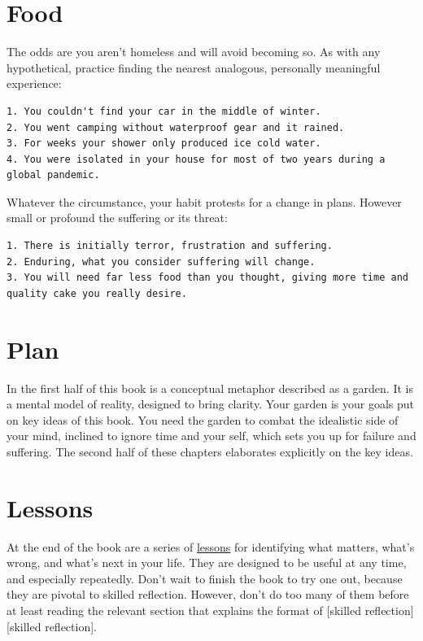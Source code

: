 \documentclass[
]{book}
\begin{document}
\hypertarget{food}{%
\section{Food}\label{food}}

The odds are you aren't homeless and will avoid becoming so.
As with any hypothetical, practice finding the nearest analogous, personally meaningful experience:

\begin{verbatim}
1. You couldn't find your car in the middle of winter.
2. You went camping without waterproof gear and it rained.
3. For weeks your shower only produced ice cold water.
4. You were isolated in your house for most of two years during a global pandemic.  
\end{verbatim}

Whatever the circumstance, your habit protests for a change in plans.
However small or profound the suffering or its threat:

\begin{verbatim}
1. There is initially terror, frustration and suffering.
2. Enduring, what you consider suffering will change.
3. You will need far less food than you thought, giving more time and quality cake you really desire.   
\end{verbatim}

\hypertarget{intro-plan}{%
\section{Plan}\label{intro-plan}}

In the first half of this book is a conceptual metaphor described as a garden.
It is a mental model of reality, designed to bring clarity.
Your garden is your goals put on key ideas of this book.
You need the garden to combat the idealistic side of your mind, inclined to ignore time and your self, which sets you up for failure and suffering.
The second half of these chapters elaborates explicitly on the key ideas.

\hypertarget{intro-lessons}{%
\section{Lessons}\label{intro-lessons}}

At the end of the book are a series of \protect\hyperlink{zero-or-one}{lessons} for identifying what matters, what's wrong, and what's next in your life.
They are designed to be useful at any time, and especially repeatedly.
Don't wait to finish the book to try one out, because they are pivotal to skilled reflection.
However, don't do too many of them before at least reading the relevant section that explains the format of {[}skilled reflection{]}{[}skilled reflection{]}.
\end{document}
